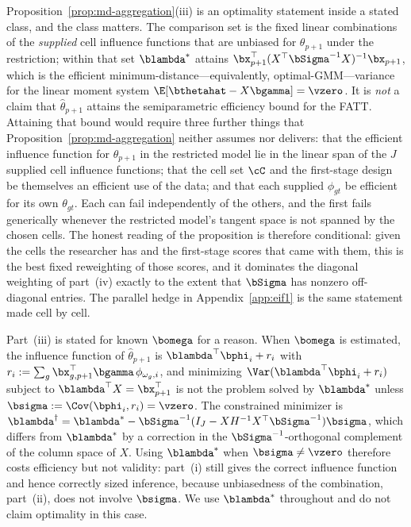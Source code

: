\documentclass{article}
\begin{document}
\begin{remark}\label{rem:md-efficiency}
Proposition~\ref{prop:md-aggregation}(iii) is an optimality statement inside a stated class, and the class matters. The comparison set is the fixed linear combinations of the \emph{supplied} cell influence functions that are unbiased for $\theta_{p+1}$ under the restriction; within that set $\blambda^{*}$ attains $\bx_{p+1}^{\top}(X^{\top}\bSigma^{-1}X)^{-1}\bx_{p+1}$, which is the efficient minimum-distance---equivalently, optimal-GMM---variance for the linear moment system $\E[\bthetahat - X\bgamma] = \vzero$. It is \emph{not} a claim that $\widehat{\theta}_{p+1}$ attains the semiparametric efficiency bound for the FATT. Attaining that bound would require three further things that Proposition~\ref{prop:md-aggregation} neither assumes nor delivers: that the efficient influence function for $\theta_{p+1}$ in the restricted model lie in the linear span of the $J$ supplied cell influence functions; that the cell set $\cC$ and the first-stage design be themselves an efficient use of the data; and that each supplied $\phi_{gt}$ be efficient for its own $\theta_{gt}$. Each can fail independently of the others, and the first fails generically whenever the restricted model's tangent space is not spanned by the chosen cells. The honest reading of the proposition is therefore conditional: given the cells the researcher has and the first-stage scores that came with them, this is the best fixed reweighting of those scores, and it dominates the diagonal weighting of part~(iv) exactly to the extent that $\bSigma$ has nonzero off-diagonal entries. The parallel hedge in Appendix~\ref{app:eif1} is the same statement made cell by cell.
\end{remark}

\begin{remark}\label{rem:md-omega}
Part~(iii) is stated for known $\bomega$ for a reason. When $\bomega$ is estimated, the influence function of $\widehat{\theta}_{p+1}$ is $\blambda^{\top}\bphi_i + r_i$ with $r_i := \sum_g \bx_{g,p+1}^{\top}\bgamma\,\phi_{\omega_g,i}$, and minimizing $\Var(\blambda^{\top}\bphi_i + r_i)$ subject to $\blambda^{\top}X = \bx_{p+1}^{\top}$ is not the problem solved by $\blambda^{*}$ unless $\bsigma := \Cov(\bphi_i, r_i) = \vzero$. The constrained minimizer is $\blambda^{\dagger} = \blambda^{*} - \bSigma^{-1}(I_J - X H^{-1}X^{\top}\bSigma^{-1})\bsigma$, which differs from $\blambda^{*}$ by a correction in the $\bSigma^{-1}$-orthogonal complement of the column space of $X$. Using $\blambda^{*}$ when $\bsigma \neq \vzero$ therefore costs efficiency but not validity: part~(i) still gives the correct influence function and hence correctly sized inference, because unbiasedness of the combination, part~(ii), does not involve $\bsigma$. We use $\blambda^{*}$ throughout and do not claim optimality in this case.
\end{remark}
\end{document}
